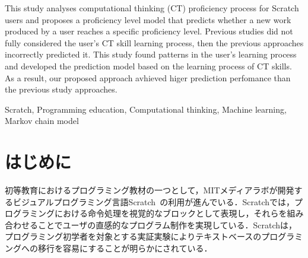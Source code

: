 \documentclass[submit]{ipsj}
\begin{document}
\begin{eabstract}
This study analyses computational thinking (CT) proficiency process for Scratch users and proposes a proficiency level model that predicts
whether a new work produced by a user reaches a specific proficiency level. Previous studies did not fully considered the user's CT skill learning process, then the previous approaches incorrectly predicted it. This study found patterns in the user's learning process and developed the prediction model based on the learning process of CT skills. As a result, our proposed approach avhieved higer prediction perfomance than the previous study approaches.
\end{eabstract}

\begin{ekeyword}
Scratch, Programming education, Computational thinking, Machine learning, Markov chain model
\end{ekeyword}

\maketitle



\section{はじめに}

初等教育におけるプログラミング教材の一つとして，MITメディアラボが開発するビジュアルプログラミング言語Scratch~\cite{Resnick_2009}の利用が進んでいる．Scratchでは，プログラミングにおける命令処理を視覚的なブロックとして表現し，それらを組み合わせることでユーザの直感的なプログラム制作を実現している．Scratchは，プログラミング初学者を対象とする実証実験によりテキストベースのプログラミングへの移行を容易にすることが明らかにされている\cite{TCE17-Weintrop}．
\end{document}
